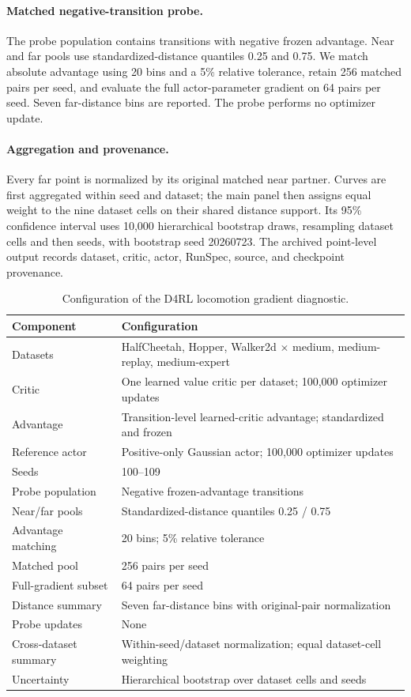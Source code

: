 \documentclass{article}
\theoremstyle{plain}
\theoremstyle{definition}
\theoremstyle{remark}
\begin{document}
\paragraph{Matched negative-transition probe.}
The probe population contains transitions with negative frozen advantage.
Near and far pools use standardized-distance quantiles 0.25 and 0.75. We match
absolute advantage using 20 bins and a 5\% relative tolerance, retain 256
matched pairs per seed, and evaluate the full actor-parameter gradient on 64
pairs per seed. Seven far-distance bins are reported. The probe performs no
optimizer update.

\paragraph{Aggregation and provenance.}
Every far point is normalized by its original matched near partner. Curves are
first aggregated within seed and dataset; the main panel then assigns equal
weight to the nine dataset cells on their shared distance support. Its 95\%
confidence interval uses 10,000 hierarchical bootstrap draws, resampling
dataset cells and then seeds, with bootstrap seed 20260723. The archived
point-level output records dataset, critic, actor, RunSpec, source, and
checkpoint provenance.

\begin{table}[t]
\centering
\caption{Configuration of the D4RL locomotion gradient diagnostic.}
\label{tab:app_d4rl_gradient_protocol}
\small
\setlength{\tabcolsep}{5pt}
\begin{tabular}{ll}
\toprule
Component & Configuration \\
\midrule
Datasets & HalfCheetah, Hopper, Walker2d $\times$ medium, medium-replay, medium-expert \\
Critic & One learned value critic per dataset; 100,000 optimizer updates \\
Advantage & Transition-level learned-critic advantage; standardized and frozen \\
Reference actor & Positive-only Gaussian actor; 100,000 optimizer updates \\
Seeds & 100--109 \\
Probe population & Negative frozen-advantage transitions \\
Near/far pools & Standardized-distance quantiles 0.25 / 0.75 \\
Advantage matching & 20 bins; 5\% relative tolerance \\
Matched pool & 256 pairs per seed \\
Full-gradient subset & 64 pairs per seed \\
Distance summary & Seven far-distance bins with original-pair normalization \\
Probe updates & None \\
Cross-dataset summary & Within-seed/dataset normalization; equal dataset-cell weighting \\
Uncertainty & Hierarchical bootstrap over dataset cells and seeds \\
\bottomrule
\end{tabular}
\end{table}
\end{document}
